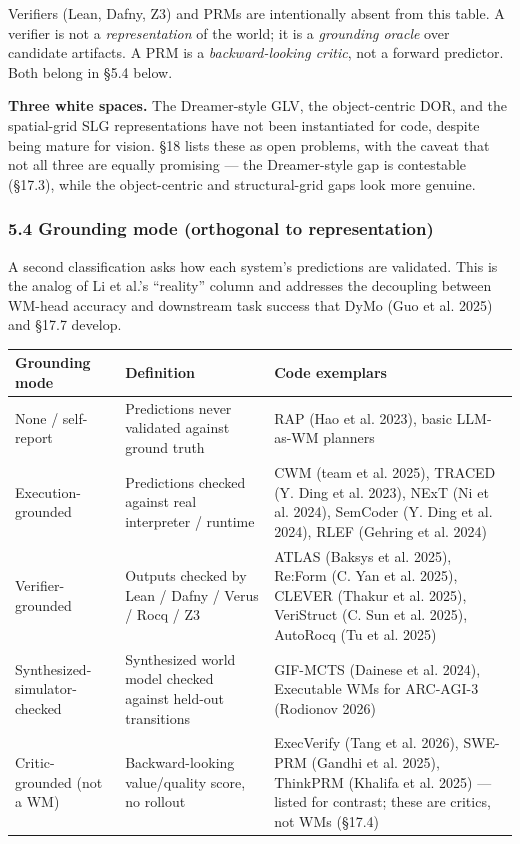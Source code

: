 \documentclass{article}
\begin{document}
Verifiers (Lean, Dafny, Z3) and PRMs are intentionally absent from this
table. A verifier is not a \emph{representation} of the world; it is a
\emph{grounding oracle} over candidate artifacts. A PRM is a
\emph{backward-looking critic}, not a forward predictor. Both belong in
§5.4 below.

\textbf{Three white spaces.} The Dreamer-style GLV, the object-centric
DOR, and the spatial-grid SLG representations have not been instantiated
for code, despite being mature for vision. §18 lists these as open
problems, with the caveat that not all three are equally promising ---
the Dreamer-style gap is contestable (§17.3), while the object-centric
and structural-grid gaps look more genuine.

\hypertarget{grounding-mode-orthogonal-to-representation}{%
\subsubsection{5.4 Grounding mode (orthogonal to
representation)}\label{grounding-mode-orthogonal-to-representation}}

A second classification asks how each system's predictions are
validated. This is the analog of Li et al.'s ``reality'' column and
addresses the decoupling between WM-head accuracy and downstream task
success that DyMo (Guo et al. 2025) and §17.7 develop.

\begin{longtable}[]{@{}
  >{\raggedright\arraybackslash}p{}
  >{\raggedright\arraybackslash}p{}
  >{\raggedright\arraybackslash}p{}@{}}
\toprule
Grounding mode & Definition & Code exemplars \\
\midrule
\endhead
None / self-report & Predictions never validated against ground truth &
RAP (Hao et al. 2023), basic LLM-as-WM planners \\
Execution-grounded & Predictions checked against real interpreter /
runtime & CWM (team et al. 2025), TRACED (Y. Ding et al. 2023), NExT (Ni
et al. 2024), SemCoder (Y. Ding et al. 2024), RLEF (Gehring et al.
2024) \\
Verifier-grounded & Outputs checked by Lean / Dafny / Verus / Rocq / Z3
& ATLAS (Baksys et al. 2025), Re:Form (C. Yan et al. 2025), CLEVER
(Thakur et al. 2025), VeriStruct (C. Sun et al. 2025), AutoRocq (Tu et
al. 2025) \\
Synthesized-simulator-checked & Synthesized world model checked against
held-out transitions & GIF-MCTS (Dainese et al. 2024), Executable WMs
for ARC-AGI-3 (Rodionov 2026) \\
Critic-grounded (not a WM) & Backward-looking value/quality score, no
rollout & ExecVerify (Tang et al. 2026), SWE-PRM (Gandhi et al. 2025),
ThinkPRM (Khalifa et al. 2025) --- listed for contrast; these are
critics, not WMs (§17.4) \\
\bottomrule
\end{longtable}
\end{document}
